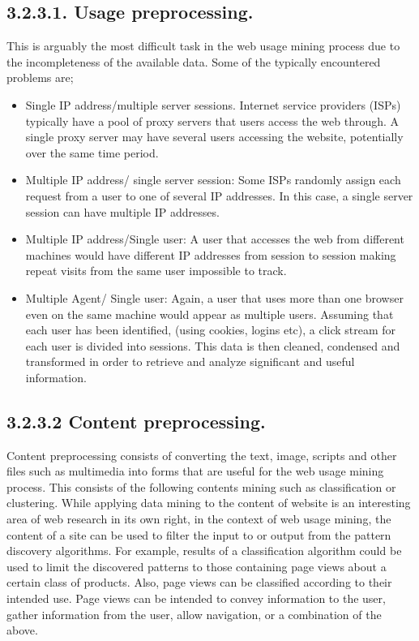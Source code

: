 \documentclass{article}
\begin{document}
\subsection*{\small{3.2.3.1. Usage preprocessing.}}  This is arguably the most difficult task in the web usage mining process due to the incompleteness of the available data. 
Some of the typically encountered problems are;
\begin{itemize}
\item Single IP address/multiple server sessions. Internet service providers (ISPs) typically have a pool of proxy servers that users access the web through. A single proxy server may have several users accessing the website, potentially over the same time period.
\item Multiple IP address/ single server session:
Some ISPs randomly assign each request from a user to one of several IP addresses. In this case, a single server session can have multiple IP addresses.
\item Multiple IP address/Single user:
A user that accesses the web from different machines would have different IP addresses from session to session making repeat visits from the same user impossible to track.
\item Multiple Agent/ Single user:
Again, a user that uses more than one browser even on the same machine would appear as multiple users. Assuming that each user has been identified, (using cookies,           logins etc), a click stream for each user is divided into sessions. This data is then cleaned, condensed and transformed in order to retrieve and analyze significant and useful information. 
\end{itemize}
\subsection*{\small{3.2.3.2 Content preprocessing.}}
Content preprocessing consists of converting the text, image, scripts and other files such as multimedia into forms that are useful for the web usage mining process. This consists of the following contents mining such as classification or clustering. While applying data mining to the content of website is an interesting area of web research in its own right, in the context of web usage mining, the content of a site can be used to filter the input to or output from the pattern discovery algorithms. For example, results of a classification algorithm could be used to limit the discovered patterns to those containing page views about a certain class of products. Also, page views can be classified according to their intended use. Page views can be intended to convey information to the user, gather information from the user, allow navigation, or a combination of the above. 
\end{document}
